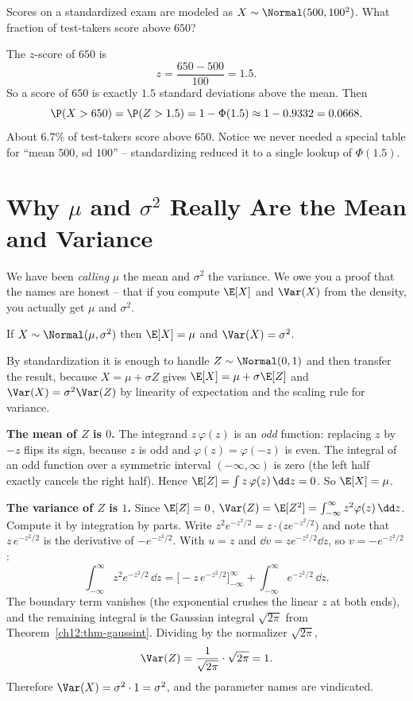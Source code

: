 \begin{example}
\label{ch12:ex-zscore}
Scores on a standardized exam are modeled as $X \sim \Normal(500, 100^2)$. What
fraction of test-takers score above $650$?

The $z$-score of $650$ is
\[
  z = \frac{650 - 500}{100} = 1.5.
\]
So a score of $650$ is exactly $1.5$ standard deviations above the mean. Then
\[
  \P(X > 650) = \P(Z > 1.5) = 1 - \Phi(1.5) \approx 1 - 0.9332 = 0.0668.
\]
About $6.7\%$ of test-takers score above $650$. Notice we never needed a special
table for ``mean $500$, sd $100$'' -- standardizing reduced it to a single lookup
of $\Phi(1.5)$.
\end{example}

\section{Why $\mu$ and $\sigma^2$ Really Are the Mean and Variance}
\label{ch12:moments}

We have been \emph{calling} $\mu$ the mean and $\sigma^2$ the variance. We owe you
a proof that the names are honest -- that if you compute $\E[X]$ and $\Var(X)$ from
the density, you actually get $\mu$ and $\sigma^2$.

\begin{proposition}
\label{ch12:prop-moments}
If $X \sim \Normal(\mu,\sigma^2)$ then $\E[X] = \mu$ and $\Var(X) = \sigma^2$.
\end{proposition}

\begin{whybox}
By standardization it is enough to handle $Z \sim \Normal(0,1)$ and then transfer
the result, because $X = \mu + \sigma Z$ gives $\E[X] = \mu + \sigma\E[Z]$ and
$\Var(X) = \sigma^2 \Var(Z)$ by linearity of expectation and the scaling rule for
variance.

\textbf{The mean of $Z$ is $0$.} The integrand $z\,\varphi(z)$ is an
\emph{odd} function: replacing $z$ by $-z$ flips its sign, because $z$ is odd and
$\varphi(z) = \varphi(-z)$ is even. The integral of an odd function over a
symmetric interval $(-\infty,\infty)$ is zero (the left half exactly cancels the
right half). Hence $\E[Z] = \int z\,\varphi(z)\,\dd z = 0$. So $\E[X] = \mu$.

\textbf{The variance of $Z$ is $1$.} Since $\E[Z]=0$, $\Var(Z) = \E[Z^2] =
\int_{-\infty}^{\infty} z^2 \varphi(z)\,\dd z$. Compute it by integration by
parts. Write $z^2 e^{-z^2/2} = z\cdot\big(z e^{-z^2/2}\big)$ and note that
$z\,e^{-z^2/2}$ is the derivative of $-e^{-z^2/2}$. With $u = z$ and
$\dd v = z e^{-z^2/2}\dd z$, so $v = -e^{-z^2/2}$:
\[
  \int_{-\infty}^{\infty} z^2 e^{-z^2/2}\,\dd z
   = \Big[-z\,e^{-z^2/2}\Big]_{-\infty}^{\infty}
     + \int_{-\infty}^{\infty} e^{-z^2/2}\,\dd z.
\]
The boundary term vanishes (the exponential crushes the linear $z$ at both ends),
and the remaining integral is the Gaussian integral $\sqrt{2\pi}$ from
Theorem~\ref{ch12:thm-gaussint}. Dividing by the normalizer $\sqrt{2\pi}$,
\[
  \Var(Z) = \frac{1}{\sqrt{2\pi}}\cdot \sqrt{2\pi} = 1.
\]
Therefore $\Var(X) = \sigma^2 \cdot 1 = \sigma^2$, and the parameter names are
vindicated.
\end{whybox}

